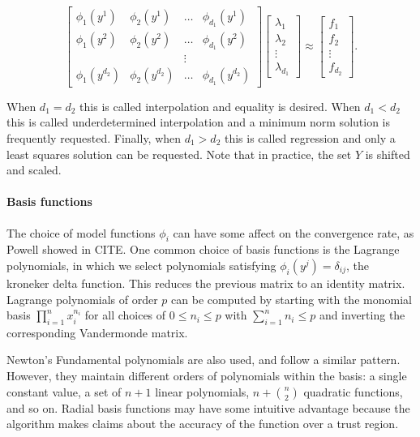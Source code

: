 \documentclass{article}
\begin{document}
\[
\begin{bmatrix}
    \phi_1(y^1)      & \phi_2(y^1)       & \ldots & \phi_{d_1}(y^1)      \\
    \phi_1(y^2)      & \phi_2(y^2)       & \dots  & \phi_{d_1}(y^2)      \\
                     &                   & \vdots &                      \\
    \phi_1(y^{d_2})  & \phi_2(y^{d_2})   & \ldots & \phi_{d_1}(y^{d_2})
\end{bmatrix}
\begin{bmatrix}
    \lambda_1      \\
    \lambda_2      \\
    \vdots         \\            
    \lambda_{d_1}
\end{bmatrix}
\approx
\begin{bmatrix}
    f_1      \\
    f_2      \\
    \vdots         \\            
    f_{d_2}
\end{bmatrix}.
\]

When $d_1 = d_2$ this is called interpolation and equality is desired. When $d_1 < d_2$ this is called underdetermined interpolation and a minimum norm solution is frequently requested. Finally, when $d_1 > d_2$ this is called regression and only a least squares solution can be requested.
Note that in practice, the set $Y$ is shifted and scaled.

\paragraph{Basis functions}

The choice of model functions $\phi_i$ can have some affect on the convergence rate, as Powell showed in CITE.
One common choice of basis functions is the Lagrange polynomials, in which we select polynomials satisfying $\phi_{i}(y^j) = \delta_{ij}$, the kroneker delta function.
This reduces the previous matrix to an identity matrix.
Lagrange polynomials of order $p$ can be computed by starting with the monomial basis $\prod_{i=1}^{n} x_i^{n_i}$ for all choices of $0 \le n_i \le p$ with $\sum_{i=1}^n n_i \le p$ and inverting the corresponding Vandermonde matrix.

Newton's Fundamental polynomials are also used, and follow a similar pattern.
However, they maintain different orders of polynomials within the basis:
a single constant value, a set of $n+1$ linear polynomials,
$n + {n \choose 2}$ quadratic functions, and so on.
Radial basis functions may have some intuitive advantage because the algorithm makes claims about the accuracy of the function over a trust region.
\end{document}
